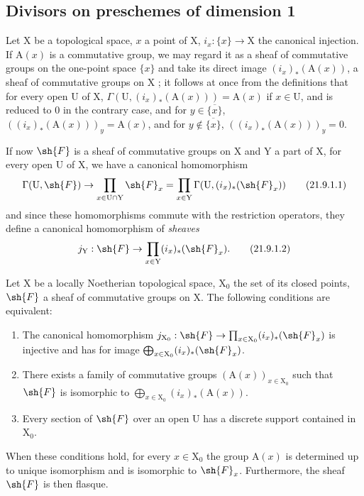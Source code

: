 \subsection{Divisors on preschemes of dimension 1}
\label{subsection:IV.21.9}
\label{IV.21.9}

\begin{env}[21.9.1]
\label{IV.21.9.1}
Let $\mathrm{X}$ be a topological space, $x$ a point of $\mathrm{X}$, $i_x:\{x\}\to\mathrm{X}$ the canonical injection.
If $\mathrm{A}(x)$ is a commutative group, we may regard it as a sheaf of commutative groups on the one-point space $\{x\}$ and take its direct image $(i_x)_*(\mathrm{A}(x))$, a sheaf of commutative groups on $\mathrm{X}$ ;
it follows at once from the definitions that for every open $\mathrm{U}$ of $\mathrm{X}$, $\Gamma(\mathrm{U},(i_x)_*(\mathrm{A}(x)))=\mathrm{A}(x)$ if $x\in\mathrm{U}$, and is reduced to $0$ in the contrary case, and for $y\in\overline{\{x\}}$, $((i_x)_*(\mathrm{A}(x)))_y=\mathrm{A}(x)$, and for $y\notin\overline{\{x\}}$, $((i_x)_*(\mathrm{A}(x)))_y=0$.

If now $\sh{F}$ is a sheaf of commutative groups on $\mathrm{X}$ and $\mathrm{Y}$ a part of $\mathrm{X}$, for every open $\mathrm{U}$ of $\mathrm{X}$, we have a canonical homomorphism
\[
\label{IV.21.9.1.1}
  \Gamma(\mathrm{U},\sh{F})\to\prod_{x\in\mathrm{U}\cap\mathrm{Y}}\sh{F}_x=\prod_{x\in\mathrm{Y}}\Gamma(\mathrm{U},(i_x)_*(\sh{F}_x))
  \tag{21.9.1.1}
\]
and since these homomorphisms commute with the restriction operators, they define a canonical homomorphism of \emph{sheaves}
\[
\label{IV.21.9.1.2}
  j_\mathrm{Y}:\sh{F}\to\prod_{x\in\mathrm{Y}}(i_x)_*(\sh{F}_x).
  \tag{21.9.1.2}
\]
\end{env}

\begin{lemma}[21.9.2]
\label{IV.21.9.2}
Let $\mathrm{X}$ be a locally Noetherian topological space, $\mathrm{X}_0$ the set of its closed points, $\sh{F}$ a sheaf of commutative groups on $\mathrm{X}$.
The following conditions are equivalent:
\begin{enumerate}[label=\emph{\alph*)}]
  \item The canonical homomorphism $j_{\mathrm{X}_0}:\sh{F}\to\prod_{x\in\mathrm{X}_0}(i_x)_*(\sh{F}_x)$ is injective and has for image $\bigoplus_{x\in\mathrm{X}_0}(i_x)_*(\sh{F}_x)$.
  \item[\rm a$'$)] There exists a family of commutative groups $(\mathrm{A}(x))_{x\in\mathrm{X}_0}$ such that $\sh{F}$ is isomorphic to $\bigoplus_{x\in\mathrm{X}_0}(i_x)_*(\mathrm{A}(x))$.
  \item Every section of $\sh{F}$ over an open $\mathrm{U}$ has a discrete support contained in $\mathrm{X}_0$.
\end{enumerate}
When these conditions hold, for every $x\in\mathrm{X}_0$ the group $\mathrm{A}(x)$ is determined up to unique isomorphism and is isomorphic to $\sh{F}_x$.
Furthermore, the sheaf $\sh{F}$ is then flasque.
\end{lemma}

